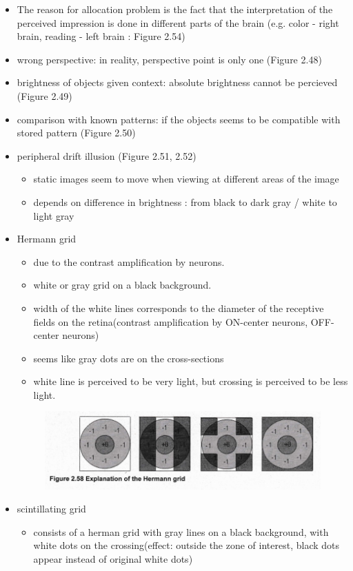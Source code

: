 \documentclass{standalone}
\begin{document}
\begin{itemize}
	\item The reason for allocation problem is the fact that the interpretation of the perceived impression is done in different parts of the brain (e.g. color - right brain, reading - left brain : Figure 2.54)
	\item wrong perspective: in reality, perspective point is only one (Figure 2.48)
	\item brightness of objects given context: absolute brightness cannot be percieved (Figure 2.49)
	\item comparison with known patterns: if the objects seems to be compatible with stored pattern (Figure 2.50)
	\item peripheral drift illusion (Figure 2.51, 2.52)
		\begin{itemize}
			\item static images seem to move when viewing at different areas of the image
			\item depends on difference in brightness : from black to dark gray / white to light gray
		\end{itemize}
	\item Hermann grid
		\begin{itemize}
			\item due to the contrast amplification by neurons.
			\item white or gray grid on a black background. 
			\item width of the white lines corresponds to the diameter of the receptive fields on the retina(contrast amplification by ON-center neurons, OFF-center neurons)
			\item seems like gray dots are on the cross-sections
			\item white line is perceived to be very light, but crossing is perceived to be less light.
		\end{itemize} 
		\begin{figure}[H]
			\centering
			\includegraphics[width = 0.7\linewidth]{Figures/2_58.png}
		\end{figure}
		\item scintillating grid
			\begin{itemize} 
				\item consists of a herman grid with gray lines on a black background, with white dots on the crossing(effect: outside the zone of interest, black dots appear instead of original white dots)

\end{itemize}
\end{itemize}
\end{document}
